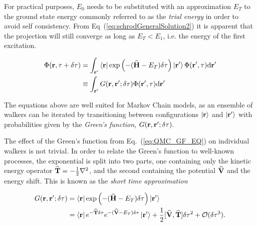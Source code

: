For practical purposes, $E_0$ needs to be substituted with an approximation $E_T$ to the ground state energy commonly referred to as the \textit{trial energy} in order to avoid self consistency. From Eq~(\ref{eq:schrodGeneralSolution2}) it is apparent that the projection will still converge as long as $E_T < E_1$, i.e. the energy of the first excitation.

\begin{align}
 \Phi(\mathbf{r}, \tau + \delta\tau) &= \int_{\mathbf{r}'}\left< \mathbf{r} \right|\exp\left(-({\bf\widehat{H}} - E_T)\delta\tau\right)\left| \mathbf{r}' \right>\Phi(\mathbf{r}', \tau)\mathrm{d}\mathbf{r}' \\
  &\equiv \int_{\mathbf{r}'}G(\mathbf{r}, \mathbf{r'}; \delta\tau)\Phi(\mathbf{r}', \tau)\mathrm{d}\mathbf{r}'  \label{eq:QMC_GF_EQ}
\end{align}

The equations above are well suited for Markov Chain models, as an ensemble of walkers can be iterated by transitioning between configurations $\left| \mathbf{r} \right>$ and $\left| \mathbf{r}' \right>$ with probabilities given by the \textit{Green's function}, $G(\mathbf{r}, \mathbf{r'}; \delta\tau).$

The effect of the Green's function from Eq.~(\ref{eq:QMC_GF_EQ}) on individual walkers is not trivial. In order to relate the Green's function to well-known processes, the exponential is split into two parts, one containing only the kinetic energy operator ${\bf\widehat{T}} = -\frac{1}{2}\nabla^2$, and the second containing the potential ${\bf\widehat{V}}$ and the energy shift. This is known as the \textit{short time approximation}\cite{abInitioMC}

\begin{align}
  G(\mathbf{r}, \mathbf{r'}; \delta\tau) &= \left< \mathbf{r} \right|\exp\left(-({\bf\widehat{H}} - E_T)\delta\tau\right)\left| \mathbf{r}' \right> \label{eq:firstTrialEnergyIntro} \\
  &= \left< \mathbf{r} \right|e^{-{\bf\widehat{T}}\delta\tau}e^{-({\bf\widehat{V}} - E_T)\delta\tau}\left| \mathbf{r}' \right> + \frac{1}{2}[{\bf\widehat{V}}, {\bf\widehat{T}}]\delta\tau^2 + \mathcal{O}(\delta\tau^3).  \label{eq:shortTimeApprox}
\end{align}


